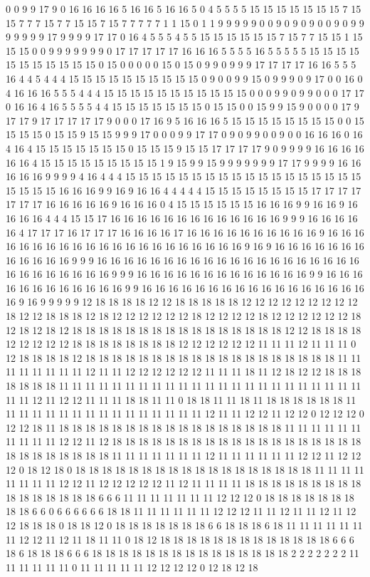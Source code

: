 0 0 9 9 17 9 0 16 16 16 16 5 16 16 5 16 16 5 0 4 5 5 5 5 15 15 15 15 15 15 15 7 15 15 7 7 7 15 7 7 15 15 7 15 7 7 7 7 7 1 1 15 0 1 1 9 9 9 9 9 0 0 9 0 9 0 9 0 0 9 0 9 9 9 9 9 9 9 17 9 9 9 9 17 17 0 16 4 5 5 5 4 5 5 15 15 15 15 15 15 7 15 7 7 15 15 1 15 15 15 0 0 9 9 9 9 9 9 9 0 17 17 17 17 17 16 16 16 5 5 5 5 16 5 5 5 5 5 15 15 15 15 15 15 15 15 15 15 15 0 15 0 0 0 0 0 15 0 15 0 9 9 0 9 9 9 17 17 17 17 16 16 5 5 5 16 4 4 5 4 4 4 15 15 15 15 15 15 15 15 15 15 0 9 0 0 9 9 15 0 9 9 9 0 9 17 0 0 16 0 4 16 16 16 5 5 5 4 4 4 15 15 15 15 15 15 15 15 15 15 15 0 0 0 9 9 0 9 9 0 0 0 17 17 0 16 16 4 16 5 5 5 5 4 4 15 15 15 15 15 15 15 0 15 15 0 0 15 9 9 15 9 0 0 0 0 17 9 17 17 9 17 17 17 17 17 9 0 0 0 17 16 9 5 16 16 16 5 15 15 15 15 15 15 15 15 0 0 15 15 15 15 0 15 15 9 15 15 9 9 9 17 0 0 0 9 9 17 17 0 9 0 9 9 0 0 9 0 0 16 16 16 0 16 4 16 4 15 15 15 15 15 15 15 0 15 15 15 9 15 15 17 17 17 17 9 0 9 9 9 9 16 16 16 16 16 16 4 15 15 15 15 15 15 15 15 15 1 9 15 9 9 15 9 9 9 9 9 9 9 17 17 9 9 9 9 16 16 16 16 16 9 9 9 9 4 16 4 4 4 15 15 15 15 15 15 15 15 15 15 15 15 15 15 15 15 15 15 15 15 15 15 16 16 16 9 9 16 9 16 16 4 4 4 4 4 15 15 15 15 15 15 15 15 17 17 17 17 17 17 17 16 16 16 16 16 9 16 16 16 0 4 15 15 15 15 15 15 16 16 16 9 9 16 16 9 16 16 16 16 4 4 4 15 15 17 16 16 16 16 16 16 16 16 16 16 16 16 16 9 9 9 16 16 16 16 16 4 17 17 17 16 17 17 17 16 16 16 16 17 16 16 16 16 16 16 16 16 16 16 9 16 16 16 16 16 16 16 16 16 16 16 16 16 16 16 16 16 16 16 16 16 9 16 9 16 16 16 16 16 16 16 16 16 16 16 16 9 9 9 16 16 16 16 16 16 16 16 16 16 16 16 16 16 16 16 16 16 16 16 16 16 16 16 16 16 16 16 9 9 9 16 16 16 16 16 16 16 16 16 16 16 16 16 9 9 16 16 16 16 16 16 16 16 16 16 16 16 9 9 16 16 16 16 16 16 16 16 16 16 16 16 16 16 16 16 16 16 9 16 9 9 9 9 9 12 18 18 18 18 12 12 18 18 18 18 18 12 12 12 12 12 12 12 12 12 18 12 12 18 18 18 12 18 12 12 12 12 12 12 18 12 12 12 12 18 12 12 12 12 12 12 18 12 18 12 18 12 18 18 18 18 18 18 18 18 18 18 18 18 18 18 18 18 12 12 18 18 18 18 12 12 12 12 12 18 18 18 18 18 18 18 18 12 12 12 12 12 12 11 11 11 12 11 11 11 0 12 18 18 18 18 12 18 18 18 18 18 18 18 18 18 18 18 18 18 18 18 18 18 18 18 11 11 11 11 11 11 11 11 12 11 11 12 12 12 12 12 12 11 11 11 18 11 12 18 12 12 18 18 18 18 18 18 18 11 11 11 11 11 11 11 11 11 11 11 11 11 11 11 11 11 11 11 11 11 11 11 11 11 12 11 12 12 11 11 11 18 18 11 11 0 18 18 11 11 18 11 18 18 18 18 18 18 11 11 11 11 11 11 11 11 11 11 11 11 11 11 11 11 12 11 11 12 12 11 12 12 0 12 12 12 0 12 12 18 11 18 18 18 18 18 18 18 18 18 18 18 18 18 18 18 18 18 11 11 11 11 11 11 11 11 11 11 12 12 11 12 18 18 18 18 18 18 18 18 18 18 18 18 18 18 18 18 18 18 18 18 18 18 18 18 18 18 18 11 11 11 11 11 11 11 12 11 11 11 11 11 11 12 12 11 12 12 12 0 18 12 18 0 18 18 18 18 18 18 18 18 18 18 18 18 18 18 18 18 18 18 11 11 11 11 11 11 11 11 12 12 11 12 12 12 12 12 11 12 11 11 11 11 18 18 18 18 18 18 18 18 18 18 18 18 18 18 18 18 6 6 6 11 11 11 11 11 11 11 12 12 12 0 18 18 18 18 18 18 18 18 18 6 6 0 6 6 6 6 6 6 18 18 11 11 11 11 11 11 12 12 12 11 11 12 11 11 12 11 12 12 18 18 18 0 18 18 12 0 18 18 18 18 18 18 18 6 6 18 18 18 6 18 11 11 11 11 11 11 11 12 12 11 12 11 18 11 11 0 18 12 18 18 18 18 18 18 18 18 18 18 18 18 18 6 6 6 18 6 18 18 18 6 6 6 18 18 18 18 18 18 18 18 18 18 18 18 18 18 18 2 2 2 2 2 2 2 11 11 11 11 11 11 0 11 11 11 11 11 12 12 12 12 0 12 18 12 18 
